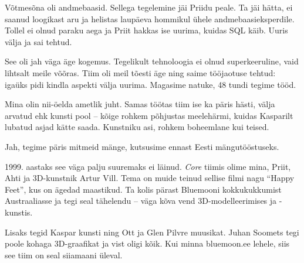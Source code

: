 
Võtmesõna oli andmebaasid. Sellega tegelemine jäi Priidu peale. Ta jäi hätta, ei saanud loogikast aru ja helistas laupäeva hommikul ühele andmebaasieksperdile. 
Tollel ei olnud paraku aega ja Priit hakkas ise uurima, kuidas 
SQL käib. Uuris välja ja sai tehtud.


See oli jah väga äge kogemus. Tegelikult tehnoloogia ei olnud superkeeruline, vaid lihtsalt meile võõras. Tiim oli meil tõesti äge 
ning saime tööjaotuse tehtud: igaüks pidi kindla aspekti välja uurima. 
Magasime natuke, 48 tundi tegime tööd.


Mina olin nii-öelda ametlik juht. Samas töötas tiim ise ka päris hästi, 
välja arvatud ehk kunsti pool -- kõige rohkem põhjustas
meelehärmi, kuidas Kasparilt lubatud asjad kätte 
saada. Kunstniku asi, rohkem boheemlane kui teised.


Jah, tegime päris mitmeid mänge, kutsusime ennast Eesti mängutööstuseks. 


1999. aastaks see väga palju suuremaks ei läinud. \emph{Core} tiimis olime 
mina, Priit, Ahti ja 3D-kunstnik Artur 
Vill. Tema on muide teinud 
sellise filmi nagu \enquote{Happy Feet}, kus on ägedad maastikud. Ta kolis 
pärast Bluemooni kokkukukkumist Austraaliasse ja tegi seal tähelendu -- väga 
kõva vend 3D-modelleerimises ja -kunstis.

Lisaks tegid Kaspar kunsti ning Ott ja Glen Pilvre muusikat. Juhan 
Soomets tegi poole kohaga 3D-graafikat ja 
vist oligi kõik. Kui minna bluemoon.ee lehele, siis see tiim on seal siiamaani 
üleval.

